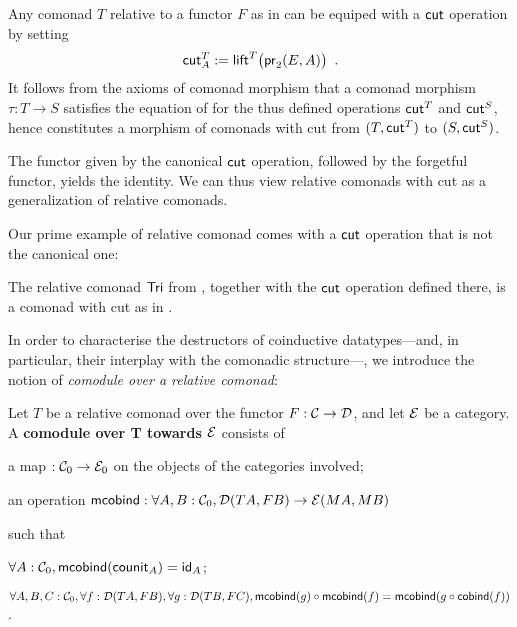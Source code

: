 \documentclass{amsart}
\newcommand{\fat}[1]{\textbf{#1}}
\begin{document}
\begin{remark}
 Any comonad $T$ relative to a functor $F$ as in  can be equiped with a $\cut$ operation by setting
   \[ \cut^T_A := \lift^T\bigl(\pr_2(E,A)\bigr) \enspace . \]
 It follows from the axioms of comonad morphism that a comonad morphism $\tau : T\to S$ satisfies the equation of  
 for the thus defined operations $\cut^T$ and $\cut^S$, hence constitutes a morphism of comonads with cut from $(T,\cut^T)$ to $(S,\cut^S)$.
\end{remark}

The functor given by the canonical $\cut$ operation, followed by the forgetful functor, yields the identity. We can thus view
relative comonads with cut as a generalization of relative comonads.

Our prime example of relative comonad comes with a $\cut$ operation that is not the canonical one:

\begin{example}\label{def:cut_for_tri}
  The relative comonad $\Tri$ from , together with the $\cut$ operation defined there, 
  is a comonad with cut as in .
\end{example}







In order to characterise the destructors of coinductive datatypes---and, in particular, their interplay with the comonadic structure---, 
we introduce the notion of \emph{comodule
over a relative comonad}:

\begin{definition}\label{def:comodule}
 Let $T$ be a relative comonad over the functor $F:\C\to\D$, and let $\E$ be a category.
 A \fat{comodule over T towards $\E$} consists of
   \begin{packitem}
   \item a map $:\C_0 \to \E_0$ on the objects of the categories involved;
   \item an operation $\mcobind: \forall A,B:\C_0, \D(TA,FB) \to \E(MA,MB)$
  \end{packitem}
  such that 
  \begin{packitem}
   \item $\forall A : \C_0, \mcobind(\counit_A) = \id_A$;
   \item $\forall A,B,C:\C_0, \forall f : \D(TA,FB),\forall g:\D(TB,FC), \\
        \comp{\mcobind(f)}{\mcobind(g)} = \mcobind(\comp{\cobind(f)}{g})$ .
  \end{packitem}

\end{definition}
\end{document}
